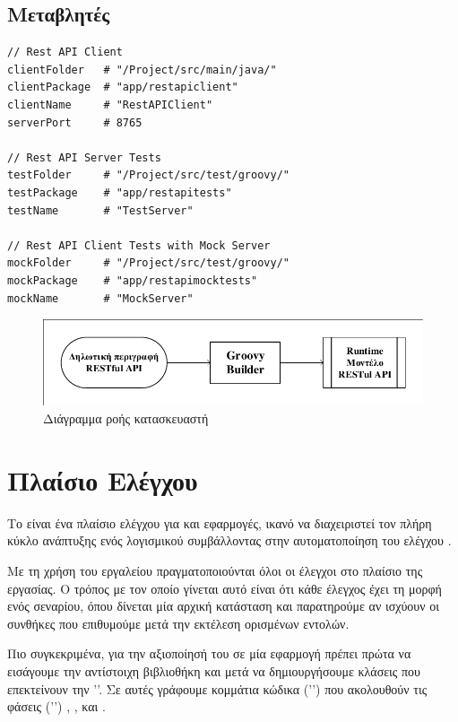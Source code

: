 
\subsection{Μεταβλητές}
\begin{lstlisting}
// Rest API Client
clientFolder   # "/Project/src/main/java/"
clientPackage  # "app/restapiclient"
clientName     # "RestAPIClient"
serverPort     # 8765

// Rest API Server Tests
testFolder     # "/Project/src/test/groovy/"
testPackage    # "app/restapitests"
testName       # "TestServer"

// Rest API Client Tests with Mock Server
mockFolder     # "/Project/src/test/groovy/"
mockPackage    # "app/restapimocktests"
mockName       # "MockServer"
\end{lstlisting}


\begin{figure}
    \centering
	\includegraphics[width=\textwidth]{figures/groovy.pdf}
    \caption{Διάγραμμα ροής κατασκευαστή}
    \label{figure4.1}
\end{figure}

\section{Πλαίσιο Ελέγχου }
Το  είναι ένα πλαίσιο ελέγχου για  και  εφαρμογές,
ικανό να διαχειριστεί τον πλήρη κύκλο ανάπτυξης ενός λογισμικού
συμβάλλοντας στην αυτοματοποίηση του ελέγχου \cite{kapelonis2016java}.

Με τη χρήση του εργαλείου  πραγματοποιούνται όλοι οι έλεγχοι στο πλαίσιο της εργασίας.
Ο τρόπος με τον οποίο γίνεται αυτό είναι ότι κάθε έλεγχος έχει τη μορφή ενός σεναρίου,
όπου δίνεται μία αρχική κατάσταση 
και παρατηρούμε αν ισχύουν οι συνθήκες που επιθυμούμε μετά την εκτέλεση ορισμένων εντολών. 

Πιο συγκεκριμένα,
για την αξιοποίησή του σε μία εφαρμογή  πρέπει 
πρώτα να εισάγουμε την αντίστοιχη βιβλιοθήκη 
και μετά να δημιουργήσουμε κλάσεις  που επεκτείνουν την '\emph{}'.
Σε αυτές γράφουμε κομμάτια κώδικα ('') που ακολουθούν τις φάσεις ('') , 
,  και .


